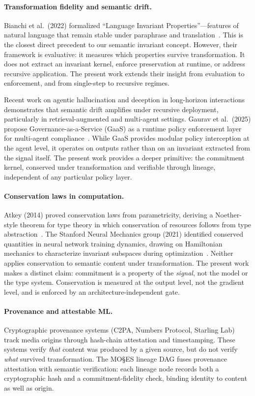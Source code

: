 \documentclass[11pt,a4paper]{article}
\begin{document}
\paragraph{Transformation fidelity and semantic drift.}
Bianchi et al.\ (2022) formalized ``Language Invariant Properties''---features of natural language that remain stable under paraphrase and translation~\cite{bianchi2022}. This is the closest direct precedent to our semantic invariant concept. However, their framework is evaluative: it measures which properties survive transformation. It does not extract an invariant kernel, enforce preservation at runtime, or address recursive application. The present work extends their insight from evaluation to enforcement, and from single-step to recursive regimes.

Recent work on agentic hallucination and deception in long-horizon interactions~\cite{xu2026,yeh2026lumina} demonstrates that semantic drift amplifies under recursive deployment, particularly in retrieval-augmented and multi-agent settings. Gaurav et al.\ (2025) propose Governance-as-a-Service (GaaS) as a runtime policy enforcement layer for multi-agent compliance~\cite{gaurav2025}. While GaaS provides modular policy interception at the agent level, it operates on outputs rather than on an invariant extracted from the signal itself. The present work provides a deeper primitive: the commitment kernel, conserved under transformation and verifiable through lineage, independent of any particular policy layer.

\paragraph{Conservation laws in computation.}
Atkey (2014) proved conservation laws from parametricity, deriving a Noether-style theorem for type theory in which conservation of resources follows from type abstraction~\cite{atkey2014}. The Stanford Neural Mechanics group (2021) identified conserved quantities in neural network training dynamics, drawing on Hamiltonian mechanics to characterize invariant subspaces during optimization~\cite{kunin2021}. Neither applies conservation to semantic content under transformation. The present work makes a distinct claim: commitment is a property of the \emph{signal}, not the model or the type system. Conservation is measured at the output level, not the gradient level, and is enforced by an architecture-independent gate.

\paragraph{Provenance and attestable ML.}
Cryptographic provenance systems (C2PA, Numbers Protocol, Starling Lab) track media origins through hash-chain attestation and timestamping. These systems verify \emph{that} content was produced by a given source, but do not verify \emph{what} survived transformation. The MO\S{}ES\texttrademark{} lineage DAG fuses provenance attestation with semantic verification: each lineage node records both a cryptographic hash and a commitment-fidelity check, binding identity to content as well as origin.
\end{document}
